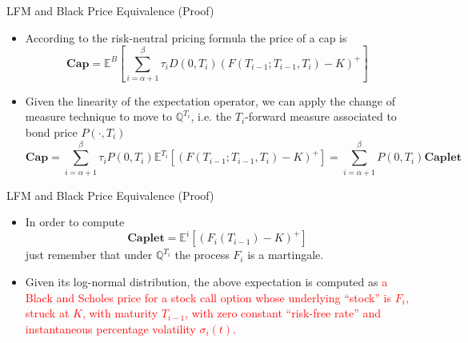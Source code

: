 \documentclass{beamer}
\begin{document}
\begin{frame}{LFM and Black Price Equivalence (Proof)}
	\begin{itemize}
	\item<1-> According to the risk-neutral pricing formula the price of a cap is 
	\begin{equation*}
		\textbf{Cap}=\mathbb{E}^B\left[\sum_{i=\alpha+1}^\beta 	\tau_iD(0, T_i)(F(T_{i-1}; T_{i-1}, T_i) - K)^+\right]
	\end{equation*}
	\item<2-> Given the linearity of the expectation operator, we can apply the change of measure technique to move to $\mathbb{Q}^{T_i}$, i.e. the $T_i$-forward measure associated to bond price $P(\cdot,T_i)$
	\begin{equation*}
		\textbf{Cap}= \sum_{i=\alpha+1}^\beta \tau_i P(0, T_i)\mathbb{E}^{T_i}[(F(T_{i-1}; T_{i-1}, T_i) - K)^+] = \sum_{i=\alpha+1}^\beta P(0, T_i)\textbf{Caplet}
	\end{equation*}
	\end{itemize}
\end{frame}

\begin{frame}{LFM and Black Price Equivalence (Proof)}
	\begin{itemize}
	\item In order to compute 
	\begin{equation*}
		\textbf{Caplet} = \mathbb{E}^i[(F_i(T_{i-1}) - K)^+]
	\end{equation*}
	just remember that under $\mathbb{Q}^{T_i}$ the process $F_i$ is a martingale.
	\item Given its log-normal distribution, the above expectation is computed as \textcolor{red}{a Black and Scholes price for a stock call option whose underlying “stock” is $F_i$, struck at $K$, with maturity $T_{i-1}$, with zero constant “risk-free rate” and instantaneous percentage volatility $\sigma_i(t)$.}
\end{itemize}
\end{frame}
\end{document}

